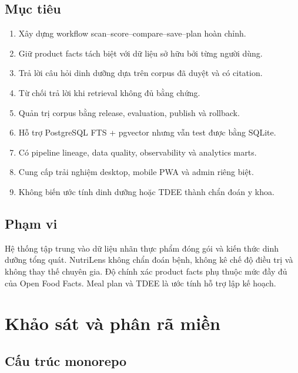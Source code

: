 \documentclass[12pt,a4paper]{report}
\begin{document}
\section{Mục tiêu}

\begin{enumerate}
  \item Xây dựng workflow scan--score--compare--save--plan hoàn chỉnh.
  \item Giữ product facts tách biệt với dữ liệu sở hữu bởi từng người dùng.
  \item Trả lời câu hỏi dinh dưỡng dựa trên corpus đã duyệt và có citation.
  \item Từ chối trả lời khi retrieval không đủ bằng chứng.
  \item Quản trị corpus bằng release, evaluation, publish và rollback.
  \item Hỗ trợ PostgreSQL FTS + pgvector nhưng vẫn test được bằng SQLite.
  \item Có pipeline lineage, data quality, observability và analytics marts.
  \item Cung cấp trải nghiệm desktop, mobile PWA và admin riêng biệt.
  \item Không biến ước tính dinh dưỡng hoặc TDEE thành chẩn đoán y khoa.
\end{enumerate}

\section{Phạm vi}

Hệ thống tập trung vào dữ liệu nhãn thực phẩm đóng gói và kiến thức dinh dưỡng
tổng quát. NutriLens không chẩn đoán bệnh, không kê chế độ điều trị và không
thay thế chuyên gia. Độ chính xác product facts phụ thuộc mức đầy đủ của Open
Food Facts. Meal plan và TDEE là ước tính hỗ trợ lập kế hoạch.

\chapter{Khảo sát và phân rã miền}

\section{Cấu trúc monorepo}
\end{document}

